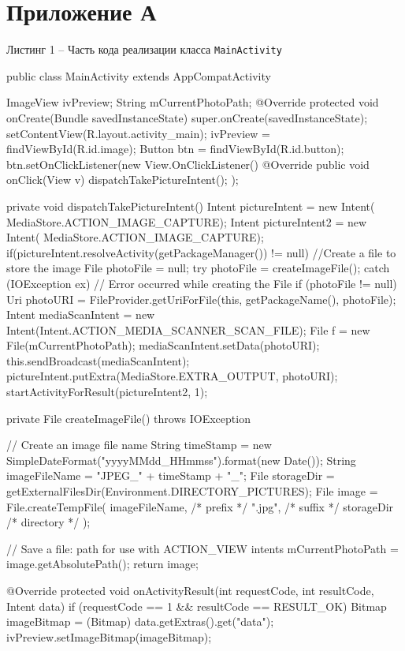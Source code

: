 \documentclass[a4paper,12pt]{article}
\begin{document}
\pagebreak

\section*{ \centering Приложение А} 

\begin{center}
	Листинг 1 -- Часть кода реализации класса \verb|MainActivity|
\end{center}


\begin{MyCode}
	
	public class MainActivity extends AppCompatActivity {	
		ImageView ivPreview;
		String mCurrentPhotoPath;
		@Override
		protected void onCreate(Bundle savedInstanceState) {
			super.onCreate(savedInstanceState);
			setContentView(R.layout.activity_main);
			ivPreview = findViewById(R.id.image);
			Button btn = findViewById(R.id.button);
			btn.setOnClickListener(new View.OnClickListener() {
				@Override
				public void onClick(View v) {
					dispatchTakePictureIntent();
				}
			});
		}
		
		private void dispatchTakePictureIntent() {
			Intent pictureIntent = new Intent(
			MediaStore.ACTION_IMAGE_CAPTURE);
			Intent pictureIntent2 = new Intent(
			MediaStore.ACTION_IMAGE_CAPTURE);
			if(pictureIntent.resolveActivity(getPackageManager()) != null){
				//Create a file to store the image
				File photoFile = null;
				try {
					photoFile = createImageFile();
				} catch (IOException ex) {
					// Error occurred while creating the File		
				}
				if (photoFile != null) {
					Uri photoURI = FileProvider.getUriForFile(this, getPackageName(), photoFile);
					Intent mediaScanIntent = new Intent(Intent.ACTION_MEDIA_SCANNER_SCAN_FILE);
					File f = new File(mCurrentPhotoPath);
					mediaScanIntent.setData(photoURI);
					this.sendBroadcast(mediaScanIntent);
					pictureIntent.putExtra(MediaStore.EXTRA_OUTPUT,
					photoURI);
					startActivityForResult(pictureIntent2,
					1);
				}
			}
		}
		
		private File createImageFile() throws IOException {
			// Create an image file name
			String timeStamp = new SimpleDateFormat("yyyyMMdd_HHmmss").format(new Date());
			String imageFileName = "JPEG_" + timeStamp + "_";
			File storageDir = getExternalFilesDir(Environment.DIRECTORY_PICTURES);
			File image = File.createTempFile(
			imageFileName,  /* prefix */
			".jpg",         /* suffix */
			storageDir      /* directory */
			);
			
			// Save a file: path for use with ACTION_VIEW intents
			mCurrentPhotoPath = image.getAbsolutePath();
			return image;
		}
		
		@Override
		protected void onActivityResult(int requestCode, int resultCode, Intent data) {
			if (requestCode == 1 && resultCode == RESULT_OK) {
				Bitmap imageBitmap = (Bitmap) data.getExtras().get("data");
				ivPreview.setImageBitmap(imageBitmap);
			}
		}
	}
\end{MyCode}
\end{document}
